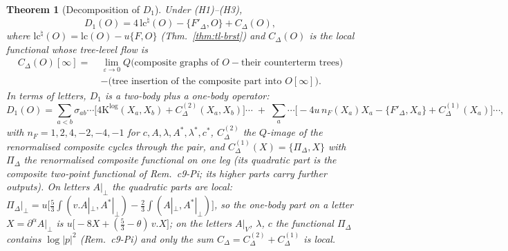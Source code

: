 \documentclass[11pt]{article}
\numberwithin{equation}{section}
\theoremstyle{plain}
\newtheorem{theorem}{Theorem}[section]
\theoremstyle{definition}
\begin{document}
\begin{theorem}[Decomposition of $D_1$]
\label{thm:tl-D1}
Under (H1)--(H3),
\begin{equation}
D_1(O)=4\,\mathrm{lc}^\natural(O)-\{F'_\Delta,O\}+C_\Delta(O),
\label{eq:tl-D1}
\end{equation}
where $\mathrm{lc}^\natural(O)=\mathrm{lc}(O)-u\{F,O\}$ (Thm.~\ref{thm:tl-brst}) and $C_\Delta(O)$ is the local functional whose tree-level flow is
\[
\begin{aligned}C_\Delta(O)[\infty]=\ &\lim_{\varepsilon\to0}Q\Big(\text{composite graphs of }O-\text{their counterterm trees}\Big)\\ &-\big(\text{tree insertion of the composite part into }O[\infty]\big).\end{aligned}
\]
In terms of letters, $D_1$ is a two-body plus a one-body operator:
\[
D_1(O)=\sum_{a<b}\sigma_{ab}\cdots\Big[4\mathrm K^{\log}(X_a,X_b)+C^{(2)}_\Delta(X_a,X_b)\Big]\cdots\;+\;\sum_a\cdots\Big[-4u\,n_F(X_a)X_a-\{F'_\Delta,X_a\}+C^{(1)}_\Delta(X_a)\Big]\cdots,
\]
with $n_F=1,2,4,-2,-4,-1$ for $c,A,\lambda,A^*,\lambda^*,c^*$, $C^{(2)}_\Delta$ the $Q$-image of the renormalised composite cycles through the pair, and $C^{(1)}_\Delta(X)=\{\Pi_\Delta,X\}$ with $\Pi_\Delta$ the renormalised composite functional on one leg (its quadratic part is the composite two-point functional of Rem.~c9-Pi; its higher parts carry further outputs). On letters $A|_\perp$ the quadratic parts are local: $\Pi_\Delta|_\perp=u\big[\tfrac53\int(v.A|_\perp,A^*|_\perp)-\tfrac23\int(A|_\perp,A^*|_\perp)\big]$, so the one-body part on a letter $X=\partial^\alpha A|_\perp$ is $u\big[-8X+(\tfrac53-\theta)\,v.X\big]$; on the letters $A|_V$, $\lambda$, $c$ the functional $\Pi_\Delta$ contains $\log|p|^2$ (Rem.~c9-Pi) and only the sum $C_\Delta=C^{(2)}_\Delta+C^{(1)}_\Delta$ is local.
\end{theorem}
\end{document}
